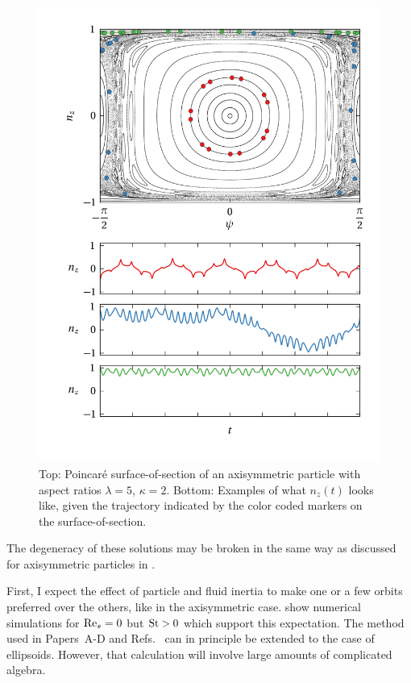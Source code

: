 \documentclass[thesis.tex]{subfiles}
\begin{document}
\begin{figure}
\centering
\includegraphics[width=12cm]{figs/poincare2o00.png}%
\caption{\label{fig:poincare2o00} Top: Poincar\'e surface-of-section of an axisymmetric particle with aspect ratios $\lambda=5$, $\kappa=2$. Bottom: Examples of what $n_z(t)$ looks like, given the trajectory indicated by the color coded markers on the surface-of-section. 
}
\end{figure}


The degeneracy of these solutions may be broken in the same way as discussed for axisymmetric particles in .

First, I expect the effect of particle and fluid inertia to make one or a few orbits preferred over the others, like in the axisymmetric case. \citet{lundell2011} show numerical simulations for $\textrm{Re}_s=0$ but $\mbox{St}>0$ which support this expectation. The method used in Papers~A-D and Refs.~\cite{subramanian2005,subramanian2006} can in principle be extended to the case of ellipsoids. However, that calculation will involve large amounts of complicated algebra.
\end{document}
